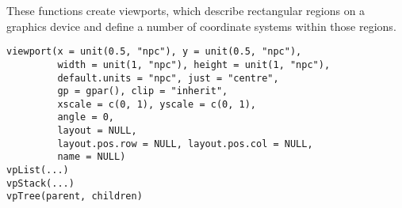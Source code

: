 %
\begin{Description}\relax
These functions create viewports, which describe rectangular regions
on a graphics device and define a number of coordinate systems within
those regions.
\end{Description}
%
\begin{Usage}
\begin{verbatim}
viewport(x = unit(0.5, "npc"), y = unit(0.5, "npc"),
         width = unit(1, "npc"), height = unit(1, "npc"),
         default.units = "npc", just = "centre", 
         gp = gpar(), clip = "inherit",
         xscale = c(0, 1), yscale = c(0, 1),
         angle = 0,
         layout = NULL,
         layout.pos.row = NULL, layout.pos.col = NULL,
         name = NULL)
vpList(...)
vpStack(...)
vpTree(parent, children)
\end{verbatim}
\end{Usage}
%
